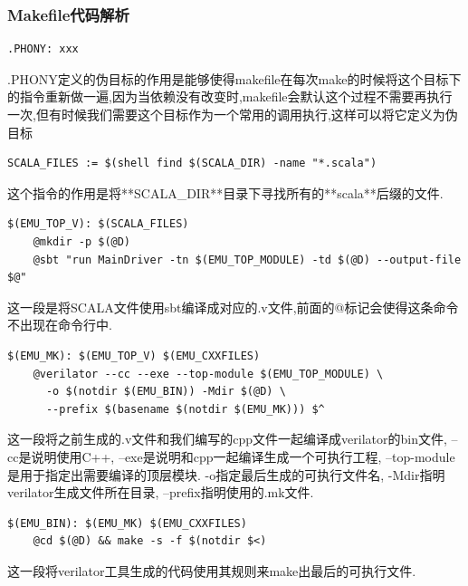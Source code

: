 \documentclass[lang=cn,11pt,a4paper]{elegantpaper}
\begin{document}
\subsubsection{Makefile代码解析}
\begin{lstlisting}
.PHONY: xxx
\end{lstlisting}
.PHONY定义的伪目标的作用是能够使得makefile在每次make的时候将这个目标下的指令重新做一遍,因为当依赖没有改变时,makefile会默认这个过程不需要再执行一次,但有时候我们需要这个目标作为一个常用的调用执行,这样可以将它定义为伪目标

\begin{lstlisting}
SCALA_FILES := $(shell find $(SCALA_DIR) -name "*.scala")
\end{lstlisting}
这个指令的作用是将**SCALA\_DIR**目录下寻找所有的**scala**后缀的文件.
\begin{lstlisting}
$(EMU_TOP_V): $(SCALA_FILES)
	@mkdir -p $(@D)
	@sbt "run MainDriver -tn $(EMU_TOP_MODULE) -td $(@D) --output-file $@"
\end{lstlisting}
这一段是将SCALA文件使用sbt编译成对应的.v文件,前面的@标记会使得这条命令不出现在命令行中.
\begin{lstlisting}
$(EMU_MK): $(EMU_TOP_V) $(EMU_CXXFILES)
	@verilator --cc --exe --top-module $(EMU_TOP_MODULE) \
	  -o $(notdir $(EMU_BIN)) -Mdir $(@D) \
	  --prefix $(basename $(notdir $(EMU_MK))) $^ 
\end{lstlisting}
这一段将之前生成的.v文件和我们编写的cpp文件一起编译成verilator的bin文件, --cc是说明使用C++, --exe是说明和cpp一起编译生成一个可执行工程, --top-module是用于指定出需要编译的顶层模块. -o指定最后生成的可执行文件名, -Mdir指明verilator生成文件所在目录, --prefix指明使用的.mk文件.

\begin{lstlisting}
$(EMU_BIN): $(EMU_MK) $(EMU_CXXFILES)
	@cd $(@D) && make -s -f $(notdir $<)
\end{lstlisting}
这一段将verilator工具生成的代码使用其规则来make出最后的可执行文件.
\end{document}
